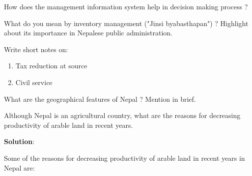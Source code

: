 \documentclass[
  openany]{book}
\newcommand{\question}{\item}
\newenvironment{solution}{ {\bfseries Solution}:}{}
\begin{document}
\begin{questions}
\question How does the management information system help in decision making process ?

\question What do you mean by inventory management ("Jinsi byabasthapan") ? Highlight about its importance in Nepalese public administration.

\question Write short notes on:
\begin{enumerate}[label*=\alph*., leftmargin=1cm]
\item Tax reduction at source
\item Civil service 
\end{enumerate}

\question What are the geographical features of Nepal ? Mention in brief.

\question Although Nepal is an agricultural country, what are the reasons for decreasing productivity of arable land in recent years.

\begin{solution}

Some of the reasons for decreasing productivity of arable land in recent years in Nepal are:


\end{solution}
\end{questions}
\end{document}
